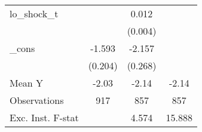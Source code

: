 {\begin{tabular}{l*{3}{c}}
\addlinespace
lo\_shock\_t  &                     &       0.012\sym{***}&                     \\
            &                     &     (0.004)         &                     \\
\addlinespace
\_cons      &      -1.593\sym{***}&      -2.157\sym{***}&                     \\
            &     (0.204)         &     (0.268)         &                     \\
\midrule
Mean Y      &       -2.03         &       -2.14         &       -2.14         \\
Observations&         917         &         857         &         857         \\
Exc. Inst. F-stat&                     &       4.574         &      15.888         \\
\bottomrule
\end{tabular}
}
